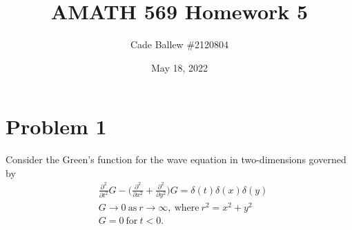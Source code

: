 \documentclass{article}
\title{AMATH 569 Homework 5}
\author{Cade Ballew \#2120804}
\date{May 18, 2022}
\begin{document}
	
\maketitle
	
\section{Problem 1}
Consider the Green's function for the wave equation in two-dimensions governed by 
\begin{equation*}
	\begin{split}
		&\frac{\partial^2}{\partial t^2}G - \big(\frac{\partial^2}{\partial x^2}+\frac{\partial^2}{\partial y^2}\big)G = \delta(t)\delta(x)\delta(y)\\
		&G \to 0 \ \text{as} \ r \to \infty, \ \text{where} \ r^2 = x^2+y^2\\
		&G = 0 \ \text{for}\  t<0.\\
	\end{split}
\end{equation*}
\end{document}
